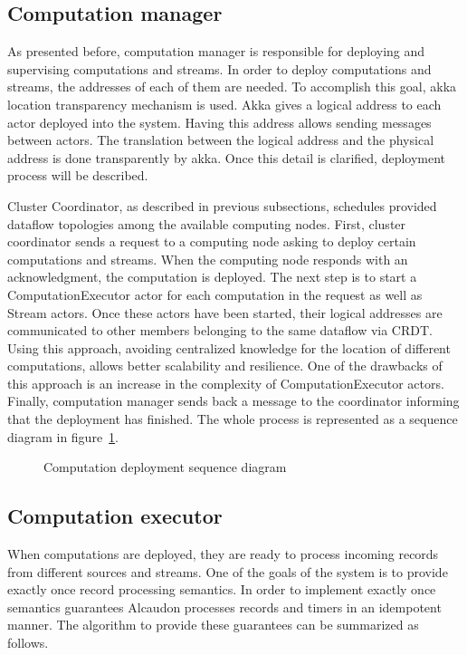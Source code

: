 \subsection{Computation manager}

As presented before, computation manager is responsible for deploying and
supervising computations and streams. In order to deploy computations and
streams, the addresses of each of them are needed. To accomplish this
goal, akka location transparency mechanism is used. Akka gives a logical address
to each actor deployed into the system. Having this address allows sending
messages between actors. The translation between the logical address and the
physical address is done transparently by akka. Once this detail is
clarified, deployment process will be described.

Cluster Coordinator, as described in previous subsections, schedules provided
dataflow topologies among the available computing nodes. First, cluster
coordinator sends a request to a computing node asking to deploy certain
computations and streams. When the computing node responds with an
acknowledgment, the computation is deployed. The next step is to start a
ComputationExecutor actor for each computation in the request as well as Stream
actors. Once these actors have been started, their logical addresses are
communicated to other members belonging to the same dataflow via \acs{CRDT}.
Using this approach, avoiding centralized knowledge for the location of
different computations, allows better scalability and resilience. One of the
drawbacks of this approach is an increase in the complexity of
ComputationExecutor actors. Finally, computation manager sends back a message to
the coordinator informing that the deployment has finished. The whole process is
represented as a sequence diagram in figure~\ref{fig:deployment}.

\begin{figure}[!h]
  \centering
  \scalebox{0.40}{
    
  }
  \caption{Computation deployment sequence diagram}
  \label{fig:deployment}
\end{figure}

\subsection{Computation executor}

When computations are deployed, they are ready to process incoming records from
different sources and streams. One of the goals of the system is to provide
exactly once record processing semantics. In order to implement exactly once
semantics guarantees Alcaudon processes records and timers in an idempotent
manner. The algorithm to provide these guarantees can be summarized as follows.

